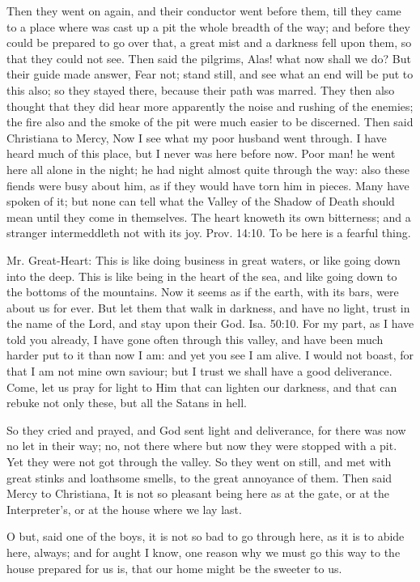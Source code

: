Then they went on again, and their conductor went before them, till they came to a place where was cast up a pit the whole breadth of the way; and before they could be prepared to go over that, a great mist and a darkness fell upon them, so that they could not see. Then said the pilgrims, Alas! what now shall we do? But their guide made answer, Fear not; stand still, and see what an end will be put to this also; so they stayed there, because their path was marred. They then also thought that they did hear more apparently the noise and rushing of the enemies; the fire also and the smoke of the pit were much easier to be discerned. Then said Christiana to Mercy, Now I see what my poor husband went through. I have heard much of this place, but I never was here before now. Poor man! he went here all alone in the night; he had night almost quite through the way: also these fiends were busy about him, as if they would have torn him in pieces. Many have spoken of it; but none can tell what the Valley of the Shadow of Death should mean until they come in themselves. The heart knoweth its own bitterness; and a stranger intermeddleth not with its joy. Prov. 14:10. To be here is a fearful thing.

Mr. Great-Heart: This is like doing business in great waters, or like going down into the deep. This is like being in the heart of the sea, and like going down to the bottoms of the mountains. Now it seems as if the earth, with its bars, were about us for ever. But let them that walk in darkness, and have no light, trust in the name of the Lord, and stay upon their God. Isa. 50:10. For my part, as I have told you already, I have gone often through this valley, and have been much harder put to it than now I am: and yet you see I am alive. I would not boast, for that I am not mine own saviour; but I trust we shall have a good deliverance. Come, let us pray for light to Him that can lighten our darkness, and that can rebuke not only these, but all the Satans in hell.

So they cried and prayed, and God sent light and deliverance, for there was now no let in their way; no, not there where but now they were stopped with a pit. Yet they were not got through the valley. So they went on still, and met with great stinks and loathsome smells, to the great annoyance of them. Then said Mercy to Christiana, It is not so pleasant being here as at the gate, or at the Interpreter's, or at the house where we lay last.

O but, said one of the boys, it is not so bad to go through here, as it is to abide here, always; and for aught I know, one reason why we must go this way to the house prepared for us is, that our home might be the sweeter to us.


